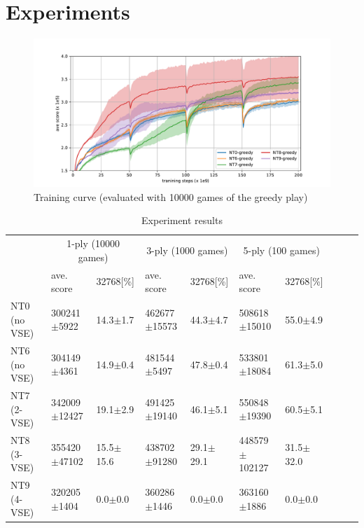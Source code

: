 \section{Experiments}


\begin{figure}
 \includegraphics[width=.95\linewidth]{figures/plot-exp2.pdf}
 \caption{Training curve (evaluated with 10000 games of the greedy play)}
 \label{fig:exp2}
\end{figure}

\begin{table}
 \caption{Experiment results}
 \label{table:exp3}
 \small\begin{tabular}{l|l|l|l|l|l|l|l|l|l}
  \hline \hline
  & \multicolumn{2}{c}{1-ply (10000 games)} & \multicolumn{2}{c}{3-ply (1000 games)} & \multicolumn{2}{c}{5-ply (100 games)} \\
  & ave. score & 32768[\%] & ave. score & 32768[\%] & ave. score & 32768[\%] \\
  \hline
   NT0 (no VSE) & 300241$\pm$\phantom{0}5922	& 14.3$\pm$\phantom{0}1.7		& 462677$\pm$15573		& 44.3$\pm$\phantom{0}4.7		& 508618$\pm$\phantom{0}15010	& 55.0$\pm$\phantom{0}4.9 \\ \hline
   NT6 (no VSE) & 304149$\pm$\phantom{0}4361	& 14.9$\pm$\phantom{0}0.4		& 481544$\pm$\phantom{0}5497	& 47.8$\pm$\phantom{0}0.4	& 533801$\pm$\phantom{0}18084	& 61.3$\pm$\phantom{0}5.0 \\ \hline
   NT7 (2-VSE)	& 342009$\pm$12427		& 19.1$\pm$\phantom{0}2.9		& 491425$\pm$19140		& 46.1$\pm$\phantom{0}5.1		& 550848$\pm$\phantom{0}19390	& 60.5$\pm$\phantom{0}5.1 \\\hline
   NT8 (3-VSE)	& 355420$\pm$47102		& 15.5$\pm$15.6				& 438702$\pm$91280		& 29.1$\pm$29.1		& 448579$\pm$102127	& 31.5$\pm$32.0 \\\hline
   NT9 (4-VSE)	& 320205$\pm$\phantom{0}1404	& \phantom{0}0.0$\pm$\phantom{0}0.0	& 360286$\pm$\phantom{0}1446	& \phantom{0}0.0$\pm$\phantom{0}0.0		& 363160$\pm$\phantom{00}1886	& \phantom{0}0.0$\pm$\phantom{0}0.0 \\\hline
 \end{tabular}
\end{table}

